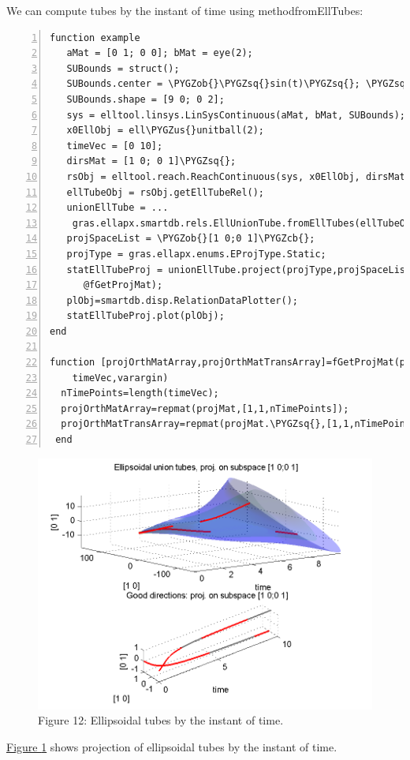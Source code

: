 \documentclass[letterpaper,10pt,english]{sphinxmanual}
\def\PYGZus{\char`\_}
\def\PYGZob{\char`\{}
\def\PYGZcb{\char`\}}
\def\PYGZsq{\char`\'}
\begin{document}
We can compute tubes by the instant of time using methodfromEllTubes:

\begin{Verbatim}[commandchars=\\\{\},numbers=left,firstnumber=1,stepnumber=1]
function example
   aMat = [0 1; 0 0]; bMat = eye(2);  
   SUBounds = struct();
   SUBounds.center = \PYGZob{}\PYGZsq{}sin(t)\PYGZsq{}; \PYGZsq{}cos(t)\PYGZsq{}\PYGZcb{};  
   SUBounds.shape = [9 0; 0 2]; 
   sys = elltool.linsys.LinSysContinuous(aMat, bMat, SUBounds);
   x0EllObj = ell\PYGZus{}unitball(2);
   timeVec = [0 10]; 
   dirsMat = [1 0; 0 1]\PYGZsq{};  
   rsObj = elltool.reach.ReachContinuous(sys, x0EllObj, dirsMat, timeVec);
   ellTubeObj = rsObj.getEllTubeRel();
   unionEllTube = ...
    gras.ellapx.smartdb.rels.EllUnionTube.fromEllTubes(ellTubeObj);
   projSpaceList = \PYGZob{}[1 0;0 1]\PYGZcb{};
   projType = gras.ellapx.enums.EProjType.Static;
   statEllTubeProj = unionEllTube.project(projType,projSpaceList,...
      @fGetProjMat);
   plObj=smartdb.disp.RelationDataPlotter();
   statEllTubeProj.plot(plObj);
end

function [projOrthMatArray,projOrthMatTransArray]=fGetProjMat(projMat,...
    timeVec,varargin)
  nTimePoints=length(timeVec);
  projOrthMatArray=repmat(projMat,[1,1,nTimePoints]);
  projOrthMatTransArray=repmat(projMat.\PYGZsq{},[1,1,nTimePoints]);
 end
\end{Verbatim}
\begin{figure}[htbp]
\centering
\capstart

\includegraphics[width=0.700\linewidth]{chapter05_section03_unionTubeStatProj.png}
\caption{Figure 12: Ellipsoidal tubes by the instant of time.}\label{chap_implement:uniontubestatproj}\end{figure}

\hyperref[chap_implement:uniontubestatproj]{Figure  \ref*{chap_implement:uniontubestatproj}} shows projection of ellipsoidal
tubes by the instant of time.
\end{document}
